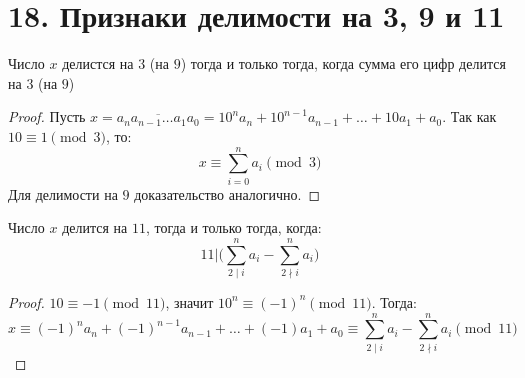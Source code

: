 \documentclass[a4paper,12pt]{article}
\begin{document}
    \section*{18. Признаки делимости на 3, 9 и 11}

        Число $x$ делистся на $3$ (на $9$) тогда и только тогда, когда сумма его цифр делится на $3$ (на $9$)
        \begin{proof}
            Пусть $x = \overline{a_{n}a_{n - 1}\ldots a_{1}a_{0}} = 10^{n}a_{n} + 10^{n - 1}a_{n - 1} + \ldots + 10a_{1} + a_{0}$. Так как\\
            $10 \equiv 1 \pmod 3$, то:
            \[
                x \equiv \sum_{i = 0}^{n} a_{i} \pmod 3
            \]
            Для делимости на $9$ доказательство аналогично.
        \end{proof}
        Число $x$ делится на $11$, тогда и только тогда, когда:
        \[
        	11 | \bigg(\sum_{2 \mid i}^{n} a_{i} - \sum_{2 \nmid i}^{n} a_{i}\bigg)
        \]
        \begin{proof}
        	$10 \equiv -1 \pmod{11}$, значит $10^{n} \equiv (-1)^{n} \pmod{11}$. Тогда:
        	\[
        		x \equiv (-1)^{n}a_{n} + (-1)^{n - 1}a_{n - 1} + \ldots + (-1)a_{1} + a_{0} \equiv \sum_{2 \mid i}^{n} a_{i} - \sum_{2 \nmid i}^{n} a_{i} \pmod{11}
        	\]
        \end{proof}
\end{document}
